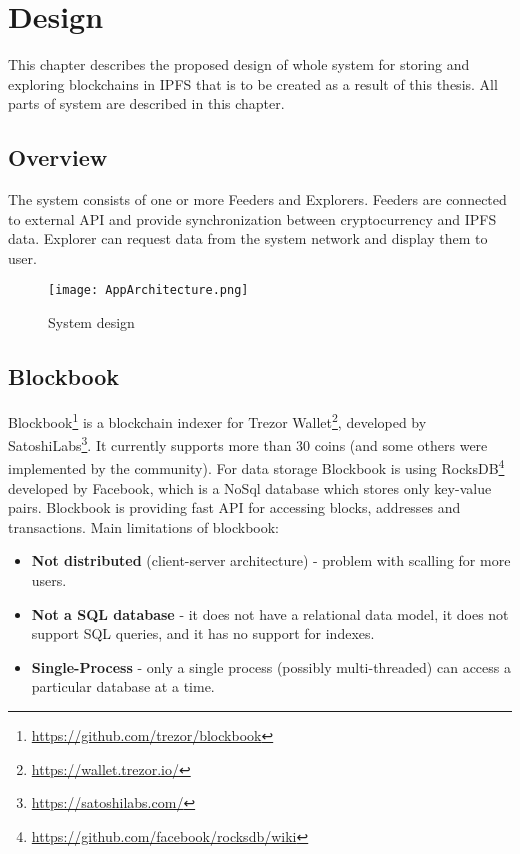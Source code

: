 \chapter{Design}
\label{Design}
This chapter describes the proposed design of whole system for storing and exploring blockchains in IPFS that is to be
created as a result of this thesis. All parts of system are described in this chapter.

\section{Overview}
The system consists of one or more Feeders and Explorers. Feeders are connected to external API and provide synchronization between cryptocurrency and IPFS data. Explorer can request data from the system network and display them to user.

\begin{figure}[h]
    \centering
    \texttt{[image: AppArchitecture.png]}
    \caption{System design}
    \label{}
\end{figure}

\section{Blockbook}
Blockbook\footnote{\url{https://github.com/trezor/blockbook}} is a blockchain indexer for Trezor Wallet\footnote{\url{https://wallet.trezor.io/}}, developed by SatoshiLabs\footnote{\url{https://satoshilabs.com/}}. It currently supports more than 30 coins (and some others were implemented by the community). For data storage Blockbook is using RocksDB\footnote{\url{https://github.com/facebook/rocksdb/wiki}} developed by Facebook, which is a NoSql database which stores only key-value pairs. Blockbook is providing fast API for accessing blocks, addresses and transactions. Main limitations of blockbook:
\begin{itemize}
    \item \textbf{Not distributed} (client-server architecture) - problem with scalling for more users. 
    \item \textbf{Not a SQL database} - it does not have a relational data model, it does not support SQL queries, and it has no support for indexes.
    \item \textbf{Single-Process} - only a single process (possibly multi-threaded) can access a particular database at a time.
\end{itemize}

